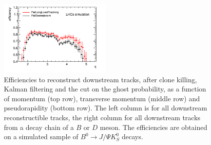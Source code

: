 \begin{figure}[tbph]
\begin{center}
\includegraphics[width = 0.49\textwidth]{figures/EffPatLLT/compare/BJpsiKSFromBDEta_TBTC.png}
\caption{Efficiencies to reconstruct downstream tracks, after clone killing, Kalman filtering and the cut on the ghost probability, as a function of momentum (top row), transverse momentum (middle row) and pseudorapidity (bottom row). The left column is for all downstream reconstructible tracks, the right column for all downstream tracks from a decay chain of a $B$ or $D$ meson. The efficiencies are obtained on a simulated sample of  $B^{0} \rightarrow J/\Psi K^{0}_{S}$ decays.}
\label{fig:EffCompPatLLTBJpsiK_TBTC}
 \end{center}
 \end{figure}

